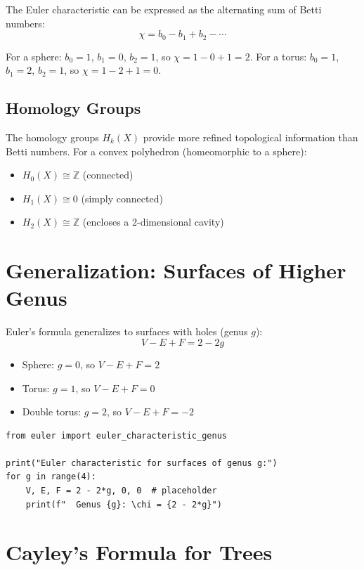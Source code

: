 The Euler characteristic can be expressed as the alternating sum of Betti numbers:
\[
\chi = b_0 - b_1 + b_2 - \cdots
\]

For a sphere: $b_0 = 1$, $b_1 = 0$, $b_2 = 1$, so $\chi = 1 - 0 + 1 = 2$.
For a torus: $b_0 = 1$, $b_1 = 2$, $b_2 = 1$, so $\chi = 1 - 2 + 1 = 0$.

\subsection{Homology Groups}

The homology groups $H_k(X)$ provide more refined topological information than Betti numbers.
For a convex polyhedron (homeomorphic to a sphere):
\begin{itemize}
\item $H_0(X) \cong \mathbb{Z}$ (connected)
\item $H_1(X) \cong 0$ (simply connected)
\item $H_2(X) \cong \mathbb{Z}$ (encloses a 2-dimensional cavity)
\end{itemize}

\section{Generalization: Surfaces of Higher Genus}

Euler's formula generalizes to surfaces with holes (genus $g$):
\[
V - E + F = 2 - 2g
\]

\begin{itemize}
\item Sphere: $g = 0$, so $V - E + F = 2$
\item Torus: $g = 1$, so $V - E + F = 0$
\item Double torus: $g = 2$, so $V - E + F = -2$
\end{itemize}

\begin{lstlisting}[caption={Euler characteristic for surfaces}, label=lst:genus]
from euler import euler_characteristic_genus

print("Euler characteristic for surfaces of genus g:")
for g in range(4):
    V, E, F = 2 - 2*g, 0, 0  # placeholder
    print(f"  Genus {g}: \chi = {2 - 2*g}")
\end{lstlisting}

\section{Cayley's Formula for Trees}

